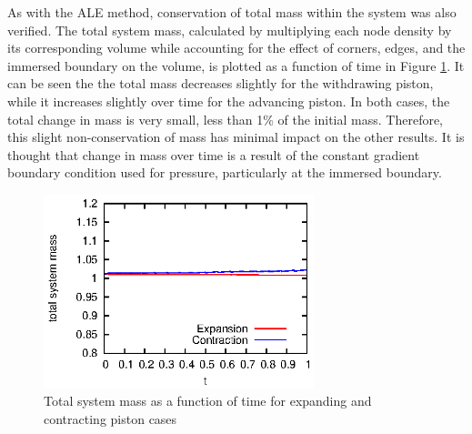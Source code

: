 \documentclass{article}
\begin{document}
As with the ALE method, conservation of total mass within the system was also verified. The total system mass, calculated by multiplying each node density by its corresponding volume while accounting for the effect of corners, edges, and the immersed boundary on the volume, is plotted as a function of time in Figure \ref{fig:plot-cons-ib}. It can be seen the the total mass decreases slightly for the withdrawing piston, while it increases slightly over time for the advancing piston. In both cases, the total change in mass is very small, less than 1\% of the initial mass. Therefore, this slight non-conservation of mass has minimal impact on the other results. It is thought that change in mass over time is a result of the constant gradient boundary condition used for pressure, particularly at the immersed boundary. 

\begin{figure}
    \centering
    \includegraphics[width=0.7\textwidth]{plot-cons-ib.eps}         
    \caption{Total system mass as a function of time for expanding and contracting piston cases}
    \label{fig:plot-cons-ib}
  \end{figure}


\end{document}
